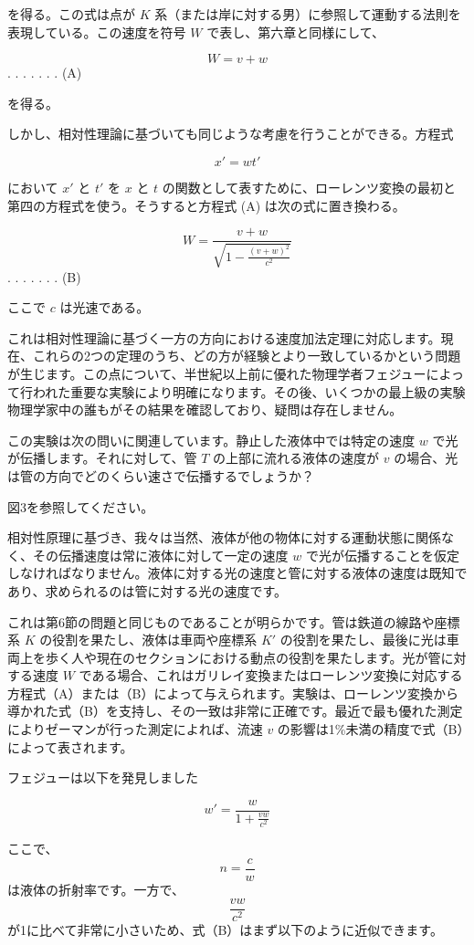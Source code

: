 \documentclass[a4paper,11pt,openany]{ltjsbook}
\begin{document}
を得る。この式は点が \( K \) 系（または岸に対する男）に参照して運動する法則を表現している。この速度を符号 \( W \) で表し、第六章と同様にして、

\[ W = v + w \] . . . . . . . (A)

を得る。

しかし、相対性理論に基づいても同じような考慮を行うことができる。方程式

\[ x' = wt' \]

において \( x' \) と \( t' \) を \( x \) と \( t \) の関数として表すために、ローレンツ変換の最初と第四の方程式を使う。そうすると方程式 (A) は次の式に置き換わる。

\[ W = \frac{v + w}{\sqrt{1 - \frac{(v + w)^2}{c^2}}} \] . . . . . . . (B)

ここで \( c \) は光速である。

これは相対性理論に基づく一方の方向における速度加法定理に対応します。現在、これらの2つの定理のうち、どの方が経験とより一致しているかという問題が生じます。この点について、半世紀以上前に優れた物理学者フェジューによって行われた重要な実験により明確になります。その後、いくつかの最上級の実験物理学家中の誰もがその結果を確認しており、疑問は存在しません。

この実験は次の問いに関連しています。静止した液体中では特定の速度 $w$ で光が伝播します。それに対して、管 $T$ の上部に流れる液体の速度が $v$ の場合、光は管の方向でどのくらい速さで伝播するでしょうか？

図3を参照してください。

相対性原理に基づき、我々は当然、液体が他の物体に対する運動状態に関係なく、その伝播速度は常に液体に対して一定の速度 $w$ で光が伝播することを仮定しなければなりません。液体に対する光の速度と管に対する液体の速度は既知であり、求められるのは管に対する光の速度です。

これは第6節の問題と同じものであることが明らかです。管は鉄道の線路や座標系 $K$ の役割を果たし、液体は車両や座標系 $K′$ の役割を果たし、最後に光は車両上を歩く人や現在のセクションにおける動点の役割を果たします。光が管に対する速度 $W$ である場合、これはガリレイ変換またはローレンツ変換に対応する方程式（A）または（B）によって与えられます。実験は、ローレンツ変換から導かれた式（B）を支持し、その一致は非常に正確です。最近で最も優れた測定によりゼーマンが行った測定によれば、流速 $v$ の影響は1\%未満の精度で式（B）によって表されます。

  フェジューは以下を発見しました

\[
w' = \frac{w}{1 + \frac{vw}{c^2}}
\]

ここで、\[
n = \frac{c}{w}
\] は液体の折射率です。一方で、\[
\frac{vw}{c^2}
\] が1に比べて非常に小さいため、式（B）はまず以下のように近似できます。
\end{document}
